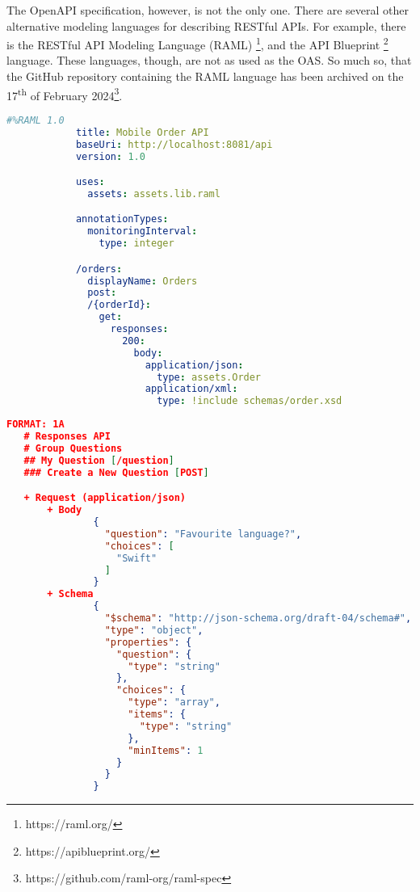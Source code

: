 \noindent The OpenAPI specification, however, is not the only one.
There are several other alternative modeling languages for describing RESTful APIs.
For example, there is the RESTful API Modeling Language (RAML) \footnote{https://raml.org/}, and the API Blueprint \footnote{https://apiblueprint.org/} language.
These languages, though, are not as used as the OAS\@.
So much so, that the GitHub repository containing the RAML language has been archived on the 17\textsuperscript{th} of February 2024\footnote{https://github.com/raml-org/raml-spec}.

\begin{lstlisting}[label={lst:raml},caption={Example of a RAML document},captionpos=b,language=yaml]
            #%RAML 1.0
            title: Mobile Order API
            baseUri: http://localhost:8081/api
            version: 1.0

            uses:
              assets: assets.lib.raml

            annotationTypes:
              monitoringInterval:
                type: integer

            /orders:
              displayName: Orders
              post:
              /{orderId}:
                get:
                  responses:
                    200:
                      body:
                        application/json:
                          type: assets.Order
                        application/xml:
                          type: !include schemas/order.xsd
\end{lstlisting}

\begin{lstlisting}[label={lst:api-blueprint},caption={Example of an API Blueprint document},captionpos=b,language=json]
   FORMAT: 1A
   # Responses API
   # Group Questions
   ## My Question [/question]
   ### Create a New Question [POST]

   + Request (application/json)
       + Body
               {
                 "question": "Favourite language?",
                 "choices": [
                   "Swift"
                 ]
               }
       + Schema
               {
                 "$schema": "http://json-schema.org/draft-04/schema#",
                 "type": "object",
                 "properties": {
                   "question": {
                     "type": "string"
                   },
                   "choices": {
                     "type": "array",
                     "items": {
                       "type": "string"
                     },
                     "minItems": 1
                   }
                 }
               }
\end{lstlisting}
